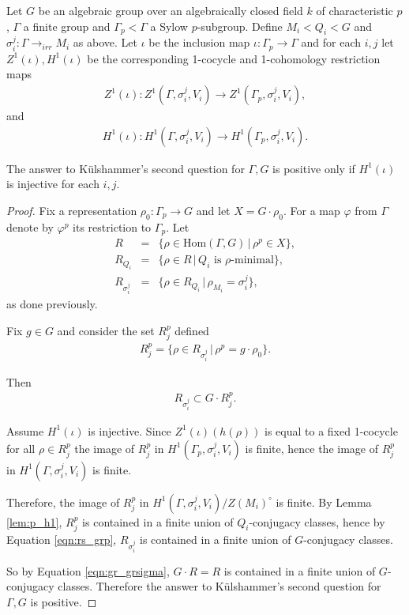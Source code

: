 \begin{theorem}
  Let $G$ be an algebraic group over an algebraically closed field $k$ of characteristic $p$, $\Gamma$ a finite group and $\Gamma_p < \Gamma$ a Sylow $p$-subgroup. Define $M_i < Q_i < G$ and $\sigma_i^{j}:\Gamma \rightarrow_{irr} M_{i}$ as above. Let $\iota$ be the inclusion map $\iota : \Gamma_p \rightarrow \Gamma$ and for each $i,j$ let $Z^1(\iota), H^1(\iota)$ be the corresponding 1-cocycle and 1-cohomology restriction maps
  \begin{eqnarray*}
    Z^1(\iota) : Z^1(\Gamma, \sigma_i^j, V_i) \rightarrow Z^1(\Gamma_p, \sigma_i^j, V_i),
  \end{eqnarray*}
  and
  \begin{eqnarray*}
    H^1(\iota) : H^1(\Gamma, \sigma_i^j, V_i) \rightarrow H^1(\Gamma_p, \sigma_i^j, V_i).
  \end{eqnarray*}
  
  The answer to K\"ulshammer's second question for $\Gamma, G$ is positive only if $H^1(\iota)$ is injective for each $i,j$.
  \label{thm:k2_h1}
\end{theorem}
\begin{proof}
  Fix a representation $\rho_0: \Gamma_p \rightarrow G$ and let $X = G \cdot \rho_0$. For a map $\varphi$ from $\Gamma$ denote by $\varphi^p$ its restriction to $\Gamma_p$. Let
  \begin{eqnarray*}
    R &=&  \{ \rho \in \textrm{Hom}(\Gamma, G) \,|\, \rho^p \in X\}, \\
    R_{Q_i} &=&  \{ \rho \in R \,|\, Q_i \textrm{ is } \rho \textrm{-minimal} \}, \\
    R_{\sigma_i^j} &=&  \{ \rho \in R_{Q_i} \,|\, \rho_{M_i} = \sigma_i^j \},
  \end{eqnarray*}
  as done previously.
  
  Fix $g \in G$ and consider the set $R_j^p$ defined
  \begin{eqnarray*}
    R_j^p = \{ \rho \in R_{\sigma_i^j} \,|\, \rho^p = g \cdot \rho_0 \}.
  \end{eqnarray*}

  Then
  \begin{eqnarray}
    R_{\sigma_i^j} \subset G \cdot R_j^p.
    \label{eqn:rs_grp}
  \end{eqnarray}

  Assume $H^1(\iota)$ is injective. Since $Z^1(\iota)(h(\rho))$ is equal to a fixed 1-cocycle for all $\rho \in R_j^p$ the image of $R_j^p$ in $H^1(\Gamma_p, \sigma_i^j, V_i)$ is finite, hence the image of $R_j^p$ in $H^1(\Gamma, \sigma_i^j, V_i)$ is finite. 
  
  Therefore, the image of $R_j^p$ in $H^1(\Gamma, \sigma_i^j, V_i)/Z(M_i)^\circ$ is finite. By Lemma \ref{lem:p_h1}, $R_j^p$ is contained in a finite union of $Q_i$-conjugacy classes, hence by Equation \ref{eqn:rs_grp}, $R_{\sigma_i^j}$ is contained in a finite union of $G$-conjugacy classes.

  So by Equation \ref{eqn:gr_grsigma}, $G \cdot R = R$ is contained in a finite union of $G$-conjugacy classes. Therefore the answer to K\"ulshammer's second question for $\Gamma, G$ is positive.
\end{proof}


